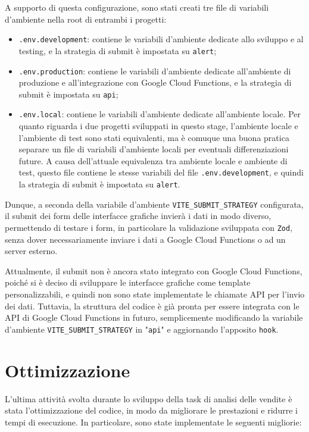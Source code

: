A supporto di questa configurazione, sono stati creati tre file di variabili d'ambiente nella root di entrambi i progetti:
\begin{itemize}
    \item \texttt{.env.development}: contiene le variabili d'ambiente dedicate allo sviluppo e al testing, e la strategia di submit è impostata su \texttt{alert};
    \item \texttt{.env.production}: contiene le variabili d'ambiente dedicate all'ambiente di produzione e all'integrazione con Google Cloud Functions, e la strategia di submit è impostata su \texttt{api};
    \item \texttt{.env.local}: contiene le variabili d'ambiente dedicate all'ambiente locale. Per quanto riguarda i due progetti sviluppati in questo stage, l'ambiente locale e l'ambiente di test sono stati equivalenti, ma è comuque una buona pratica separare un file di variabili d'ambiente locali per eventuali differenziazioni future. A causa dell'attuale equivalenza tra ambiente locale e ambiente di test, questo file contiene le stesse variabili del file \texttt{.env.development}, e quindi la strategia di submit è impostata su \texttt{alert}.
\end{itemize}

Dunque, a seconda della variabile d'ambiente \texttt{VITE\_SUBMIT\_STRATEGY} configurata, il submit dei form delle interfacce grafiche invierà i dati in modo diverso, permettendo di testare i form, in particolare la validazione sviluppata con \texttt{Zod}, senza dover necessariamente inviare i dati a Google Cloud Functions o ad un server esterno.

Attualmente, il submit non è ancora stato integrato con Google Cloud Functions, poiché si è deciso di sviluppare le interfacce grafiche come template personalizzabili, e quindi non sono state implementate le chiamate API per l'invio dei dati. Tuttavia, la struttura del codice è già pronta per essere integrata con le API di Google Cloud Functions in futuro, semplicemente modificando la variabile d'ambiente \texttt{VITE\_SUBMIT\_STRATEGY} in "\texttt{api}" e aggiornando l'apposito \texttt{hook}.



\section{Ottimizzazione}

L'ultima attività svolta durante lo sviluppo della task di analisi delle vendite è stata l'ottimizzazione del codice, in modo da migliorare le prestazioni e ridurre i tempi di esecuzione. In particolare, sono state implementate le seguenti migliorie:

